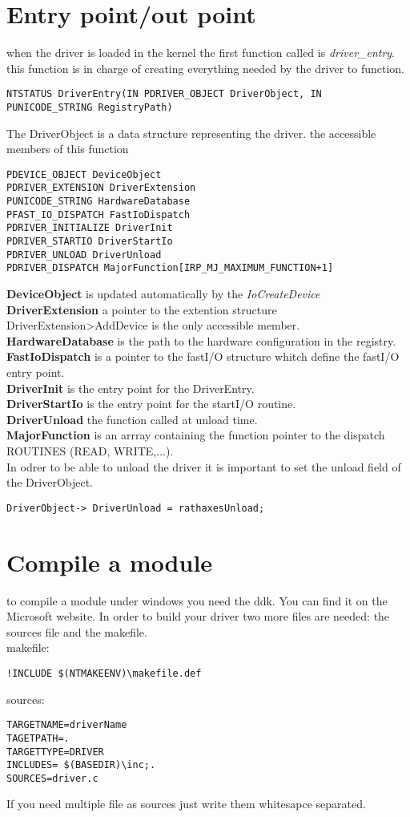 \documentclass[a4paper,10pt]{article}
\begin{document}
\section{Entry point/out point}
when the driver is loaded in the kernel the first function called is
{\it driver\_entry}. this function is in charge of creating everything needed
by the driver to function.\\
\begin{lstlisting}
NTSTATUS DriverEntry(IN PDRIVER_OBJECT DriverObject, IN PUNICODE_STRING RegistryPath)
\end{lstlisting}
The DriverObject is a data structure representing the driver. the accessible
members of this function
\begin{lstlisting}
PDEVICE_OBJECT DeviceObject
PDRIVER_EXTENSION DriverExtension
PUNICODE_STRING HardwareDatabase
PFAST_IO_DISPATCH FastIoDispatch
PDRIVER_INITIALIZE DriverInit
PDRIVER_STARTIO DriverStartIo
PDRIVER_UNLOAD DriverUnload
PDRIVER_DISPATCH MajorFunction[IRP_MJ_MAXIMUM_FUNCTION+1]
\end{lstlisting}
{\bf DeviceObject} is updated automatically by the {\it IoCreateDevice}\\
{\bf DriverExtension} a pointer to the extention structure DriverExtension>AddDevice is the only accessible member.\\
{\bf HardwareDatabase} is the path to the hardware configuration in the registry.\\
{\bf FastIoDispatch} is a pointer to the fastI/O structure whitch define the fastI/O entry point.\\
{\bf DriverInit} is the entry point for the DriverEntry.\\
{\bf DriverStartIo} is the entry point for the startI/O routine.\\
{\bf DriverUnload} the function called at unload time.\\
{\bf MajorFunction} is an arrray containing the function pointer to the dispatch ROUTINES (READ, WRITE,...).\\
In odrer to be able to unload the driver it is important to set the unload
field of the DriverObject.
\begin{lstlisting}
DriverObject-> DriverUnload = rathaxesUnload;
\end{lstlisting}

\section{Compile a module}
to compile a module under windows you need the ddk. You can find it on the
Microsoft website.
In order to build your driver two more files are needed: the sources file and
the makefile.\\
makefile:\\
\begin{lstlisting}
!INCLUDE $(NTMAKEENV)\makefile.def
\end{lstlisting}
sources:\\
\begin{lstlisting}
TARGETNAME=driverName
TAGETPATH=.
TARGETTYPE=DRIVER
INCLUDES= $(BASEDIR)\inc;.
SOURCES=driver.c
\end{lstlisting}
If you need multiple file as sources just write them whitesapce separated.
\end{document}
